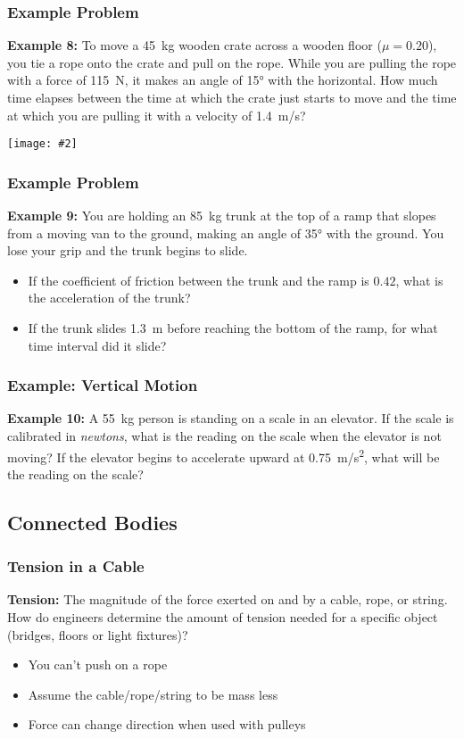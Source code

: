 \documentclass[12pt,compress,aspectratio=169]{beamer}
\newcommand{\pic}[2]{\texttt{[image: \#2]}}
\begin{document}
\begin{frame}
  \frametitle{Example Problem}
  \textbf{Example 8:} To move a \SI{45}{kg} wooden crate across a wooden floor
  ($\mu=0.20$), you tie a rope onto the crate and pull on the rope. While you
  are pulling the rope with a force of \SI{115}{N}, it makes an angle of
  \ang{15}
  with the horizontal. How much time elapses between the time at which the
  crate just starts to move and the time at which you are pulling it with a
  velocity of \SI{1.4}{m/s}?
  \begin{center}
    \pic{.5}{graphics/pull-box.png}
  \end{center}
\end{frame}

\begin{frame}
  \frametitle{Example Problem}
  \textbf{Example 9:} You are holding an \SI{85}{kg} trunk at the top of a ramp
  that slopes from a moving van to the ground, making an angle of \ang{35} with
  the ground. You lose your grip and the trunk begins to slide.
  \begin{itemize}
  \item If the coefficient of friction between the trunk and the ramp is
    $0.42$, what is the acceleration of the trunk?
  \item If the trunk slides \SI{1.3}{m} before reaching the bottom of the ramp,
    for what time interval did it slide?
  \end{itemize}
\end{frame}

\begin{frame}
  \frametitle{Example: Vertical Motion}
  \textbf{Example 10:} A \SI{55}{kg} person is standing on a scale in an
  elevator. If
  the scale is calibrated in \emph{newtons}, what is the reading on the scale
  when the elevator is not moving? If the elevator begins to accelerate upward
  at \SI{.75}{m/s^2}, what will be the reading on the scale?
\end{frame}


\subsection{Connected Bodies}


\begin{frame}
  \frametitle{Tension in a Cable}
  \textbf{Tension:} The magnitude of the force exerted on and by a cable, rope,
  or string. How do engineers determine the amount of tension needed for a
  specific object (bridges, floors or light fixtures)?

  \begin{itemize}
  \item You can't push on a rope
  \item Assume the cable/rope/string to be mass less
  \item Force can change direction when used with pulleys
  \end{itemize}
\end{frame}
\end{document}
